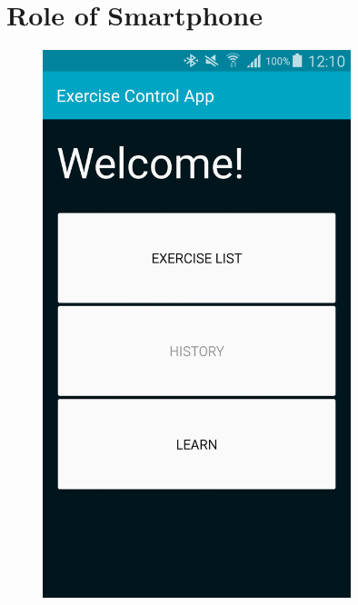\section{Role of Smartphone}

\begin{figure}[t!]
  \centering
    \begin{minipage}{0.25\textwidth}
      \centering
        \includegraphics[width=0.80\textwidth]{00_resources/figures/Android_Phone_MainView.png}
    \end{minipage}
    \begin{minipage}{0.25\textwidth}
      \centering

\end{minipage}
\end{figure}

